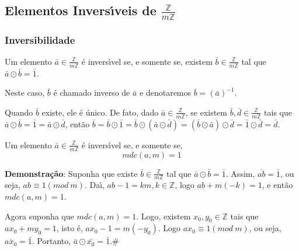 \subsection{Elementos Invers{\'\i}veis de $\displaystyle\frac{\mathbb{Z}}{m\mathbb{Z}}$}

\subsubsection{Inversibilidade}
\begin{definicao}[Inversibilidade] Um elemento $\bar{a}\in\displaystyle\frac{\mathbb{Z}}{m\mathbb{Z}}$ {\'e} invers{\'\i}vel se, e somente se, existem $\bar{b}\in\displaystyle\frac{\mathbb{Z}}{m\mathbb{Z}}$ tal que $\bar{a}\odot\bar{b}=\bar{1}$.\end{definicao}

Neste caso, $\bar{b}$ {\'e} chamado inverso de $\bar{a}$ e denotaremos $\bar{b}=(\bar{a})^{-1}$.

Quando $\bar{b}$ existe, ele {\'e} {\'u}nico. De fato, dado $\bar{a}\in\displaystyle\frac{\mathbb{Z}}{m\mathbb{Z}}$, se existem $\bar{b},\bar{d}\in\displaystyle\frac{\mathbb{Z}}{m\mathbb{Z}}$ tais que $\bar{a}\odot\bar{b}=\bar{1}=\bar{a}\odot\bar{d}$, ent{\~a}o $\bar{b}=\bar{b}\odot\bar{1}=\bar{b}\odot (\bar{a}\odot\bar{d})=(\bar{b}\odot\bar{a})\odot\bar{d}=\bar{1}\odot\bar{d}=\bar{d}$.

\begin{proposicao} Um elemento $\bar{a}\in\displaystyle\frac{\mathbb{Z}}{m\mathbb{Z}}$ {\'e} invers{\'\i}vel se, e somente se,
 \[mdc(a,m)=1\]
\end{proposicao}

\textbf{Demonstra{\c c}{\~a}o}: Suponha que existe $\bar{b}\in\displaystyle\frac{\mathbb{Z}}{m\mathbb{Z}}$ tal que $\bar{a}\odot\bar{b}=\bar{1}$. Assim, $\overline{ab}=\bar{1}$, ou seja, $ab\equiv 1(mod\ m)$. Da{\'\i}, $ab-1=km, k\in\mathbb{Z}$, logo $ab+m(-k)=1$, e ent{\~a}o $mdc(a,m)=1$.

Agora suponha que $mdc(a,m)=1$. Logo, existem $x_{0}, y_{0}\in\mathbb{Z}$ tais que $ax_{0}+my_{0}=1$, isto {\'e}, $ax_{0}-1=m(-y_{0})$. Logo $ax_{0}\equiv 1(mod\ m)$, ou seja, $\overline{ax_{0}}=\bar{1}$. Portanto, $\bar{a}\odot\bar{x_{0}}=\bar{1}$.\#

